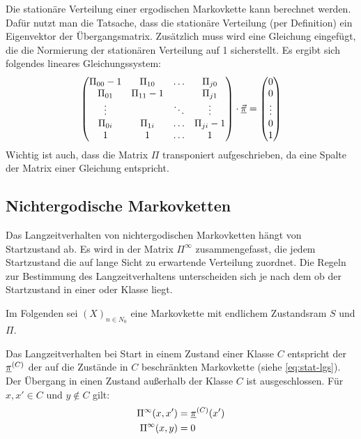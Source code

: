 Die stationäre Verteilung einer ergodischen Markovkette kann berechnet
werden. Dafür nutzt man die Tatsache, dass die stationäre Verteilung (per
Definition) ein Eigenvektor der Übergangsmatrix. Zusätzlich
muss wird eine Gleichung eingefügt, die die Normierung der stationären
Verteilung auf 1 sicherstellt. Es ergibt sich folgendes
lineares Gleichungssystem:
\begin{equation}\label{eq:stat-lgs}
\begin{pmatrix}
\Pi_{00}-1 & \Pi_{10} & \ldots & \Pi_{j0} \\
\Pi_{01} & \Pi_{11}-1 &        & \Pi_{j1} \\
\vdots   &            & \ddots & \vdots \\
\Pi_{0i} & \Pi_{1i} & \ldots &   \Pi_{ji}-1 \\
    1    &     1    & \ldots &   1
\end{pmatrix}\cdot \vec{\underline{\pi}} = \begin{pmatrix}0\\0\\\vdots\\0\\1\end{pmatrix}
\end{equation}
Wichtig ist auch, dass die Matrix $\Pi$ transponiert aufgeschrieben, da eine
Spalte der Matrix einer Gleichung entspricht.

\subsection{Nichtergodische Markovketten}

\newcommand{\lzv}{\Pi^\infty} %

Das Langzeitverhalten von nichtergodischen Markovketten hängt von Startzustand
ab. Es wird in der Matrix $\lzv$ zusammengefasst, die jedem Startzustand die auf
lange Sicht zu erwartende Verteilung zuordnet. Die Regeln zur Bestimmung des
Langzeitverhaltens unterscheiden sich je nach dem ob der Startzustand in
einer  oder 
Klasse liegt.

\medskip
Im Folgenden sei $(X)_{n\in N_0}$ eine Markovkette mit endlichem Zustandsram $S$
und  $\Pi$.

Das Langzeitverhalten bei Start in einem Zustand einer
 Klasse $C$ entspricht der
 $\underline{\pi}^{(C)}$ der auf die Zustände in
$C$ beschränkten Markovkette (siehe \eqref{eq:stat-lgs}). Der Übergang in einen
Zustand außerhalb der Klasse $C$ ist ausgeschlossen. Für $x, x' \in C$ und
$y\notin C$ gilt:
\begin{align}\label{eq:lzv-abg-abg}
  \lzv(x,x') &= \stat^{(C)}(x') \\
  \label{eq:lzv-abg-x}
  \lzv(x,y) &= 0
\end{align}

